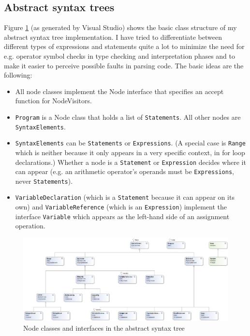 \documentclass[a4paper,11pt]{article}
\begin{document}
\subsection{Abstract syntax trees}

Figure \ref{fig:ast} (as generated by Visual Studio) shows the basic class structure of my abstract syntax tree implementation. I have tried to differentiate between different types of expressions and statements quite a lot to minimize the need for e.g. operator symbol checks in type checking and interpretation phases and to make it easier to perceive possible faults in parsing code. The basic ideas are the following:

\begin{itemize}
    \item All node classes implement the Node interface that specifies an accept function for NodeVisitors.
    \item \verb,Program, is a Node class that holds a list of \verb,Statements,. All other nodes are \verb,SyntaxElements,.
    \item \verb,SyntaxElements, can be \verb,Statements, or \verb,Expressions,. (A special case is \verb,Range, which is neither because it only appears in a very specific context, in for loop declarations.) Whether a node is a \verb,Statement, or \verb,Expression, decides where it can appear (e.g. an arithmetic operator's operands must be \verb,Expressions,, never \verb,Statements,).
    \item \verb,VariableDeclaration, (which is a \verb,Statement, because it can appear on its own) and \verb,VariableReference, (which is an \verb,Expression,) implement the interface \verb,Variable, which appears as the left-hand side of an assignment operation.
\end{itemize}

\begin{figure}
\includegraphics[scale=0.5,angle=90]{ast.png}
\caption{Node classes and interfaces in the abstract syntax tree}
\label{fig:ast}
\end{figure}
\end{document}
